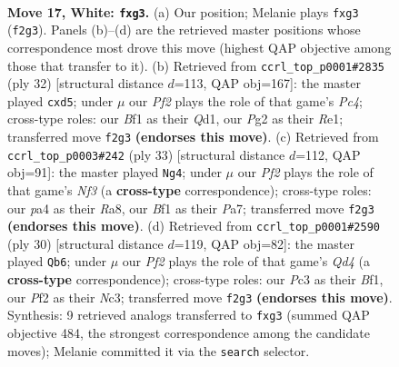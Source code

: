 \documentclass[11pt]{article}
\begin{document}
\clearpage

\begin{figure}[p]\centering
\begin{subfigure}{0.46\textwidth}\centering
\resizebox{\linewidth}{!}{%
\newchessgame
\chessboard[
  setfen={rnbq1kr1/1p2n3/4p3/1QPpPp2/p4N1p/P1P1B1p1/2P2PPP/R3KB1R w KQ - 0 17},
  showmover=false,
  pgfstyle=straightmove, color=movearrow, markmove={f2-g3}
]}
\caption{}
\end{subfigure}\hfill
\begin{subfigure}{0.46\textwidth}\centering
\resizebox{\linewidth}{!}{%
\newchessgame
\chessboard[
  setfen={2rqnrk1/p6p/bpn1p1p1/3p1p2/2PPPP2/P2BB1N1/6PP/R2QR1K1 w - - 0 17},
  showmover=false,
  pgfstyle=straightmove, color=movearrow, markmove={c4-d5}
]}
\caption{}
\end{subfigure}
\\[4pt]
\begin{subfigure}{0.46\textwidth}\centering
\resizebox{\linewidth}{!}{%
\newchessgame
\chessboard[
  setfen={r7/pp1b1rbk/2pq1npp/2pPp3/P1P1P2N/2NQ4/1P2BPP1/R3K2R b KQ - 2 17},
  showmover=false,
  pgfstyle=straightmove, color=movearrow, markmove={f6-g4}
]}
\caption{}
\end{subfigure}\hfill
\begin{subfigure}{0.46\textwidth}\centering
\resizebox{\linewidth}{!}{%
\newchessgame
\chessboard[
  setfen={r2r2k1/1pq1bppp/p1b1pn2/P2p4/3QP3/2N1B2P/1PP2PP1/R3RBK1 w - - 0 16},
  showmover=false,
  pgfstyle=straightmove, color=movearrow, markmove={d4-b6}
]}
\caption{}
\end{subfigure}
\caption{\textbf{Move 17, White: \texttt{fxg3}.} (a) Our position; Melanie plays \texttt{fxg3} (\texttt{f2g3}). Panels (b)--(d) are the retrieved master positions whose correspondence most drove this move (highest QAP objective among those that transfer to it). (b) Retrieved from \texttt{ccrl\_top\_p0001\#2835} (ply 32) [structural distance $d$=113, QAP obj=167]: the master played \texttt{cxd5}; under $\mu$ our \emph{Pf2} plays the role of that game's \emph{Pc4}; cross-type roles: our \emph{B}f1 as their \emph{Q}d1, our \emph{P}g2 as their \emph{R}e1; transferred move \texttt{f2g3} \textbf{(endorses this move)}. (c) Retrieved from \texttt{ccrl\_top\_p0003\#242} (ply 33) [structural distance $d$=112, QAP obj=91]: the master played \texttt{Ng4}; under $\mu$ our \emph{Pf2} plays the role of that game's \emph{Nf3} (a \textbf{cross-type} correspondence); cross-type roles: our \emph{p}a4 as their \emph{R}a8, our \emph{B}f1 as their \emph{P}a7; transferred move \texttt{f2g3} \textbf{(endorses this move)}. (d) Retrieved from \texttt{ccrl\_top\_p0001\#2590} (ply 30) [structural distance $d$=119, QAP obj=82]: the master played \texttt{Qb6}; under $\mu$ our \emph{Pf2} plays the role of that game's \emph{Qd4} (a \textbf{cross-type} correspondence); cross-type roles: our \emph{P}c3 as their \emph{B}f1, our \emph{P}f2 as their \emph{N}c3; transferred move \texttt{f2g3} \textbf{(endorses this move)}. Synthesis: 9 retrieved analogs transferred to \texttt{fxg3} (summed QAP objective 484, the strongest correspondence among the candidate moves); Melanie committed it via the \texttt{search} selector.}
\label{fig:thought-m32}
\end{figure}
\end{document}
